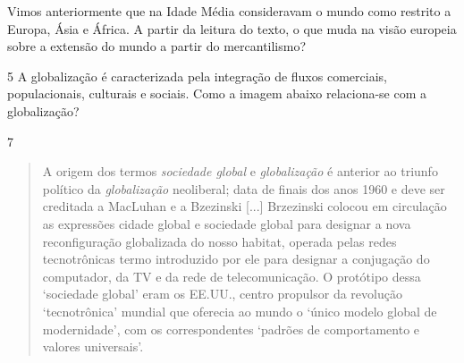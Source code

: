 Vimos anteriormente que na Idade Média consideravam o mundo como
restrito a Europa, Ásia e África. A partir da leitura do texto, o que
muda na visão europeia sobre a extensão do mundo a partir do
mercantilismo?



\num{5} A globalização é caracterizada pela integração de fluxos comerciais,
populacionais, culturais e sociais. Como a imagem abaixo relaciona-se
com a globalização?




\num{7}

\begin{quote}
A origem dos termos \emph{sociedade global}
e \emph{globalização} é anterior ao triunfo político
da \emph{globalização} neoliberal; data
de finais dos anos 1960 e deve ser creditada a MacLuhan e a Bzezinski
{[}...{]} Brzezinski colocou em circulação as expressões cidade global e
sociedade global para designar a nova reconfiguração globalizada do
nosso habitat, operada pelas redes tecnotrônicas termo introduzido por
ele para designar a conjugação do computador, da TV e da rede de
telecomunicação. O protótipo dessa `sociedade global' eram os EE.UU.,
centro propulsor da revolução `tecnotrônica' mundial que oferecia ao
mundo o `único modelo global de modernidade', com os correspondentes
`padrões de comportamento e valores universais'.

\end{quote}

